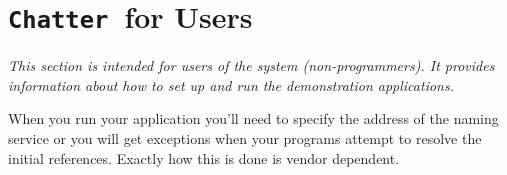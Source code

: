 \documentclass[twocolumn]{article}
\newcommand{\Chatter}{\texttt{Chatter}}
\begin{document}
\section{\Chatter\ for Users}

\textit{This section is intended for users of the system (non-programmers). It provides
  information about how to set up and run the demonstration applications.}

When you run your application you'll need to specify the address of the naming service or you
will get exceptions when your programs attempt to resolve the initial references. Exactly how
this is done is vendor dependent.
\end{document}
